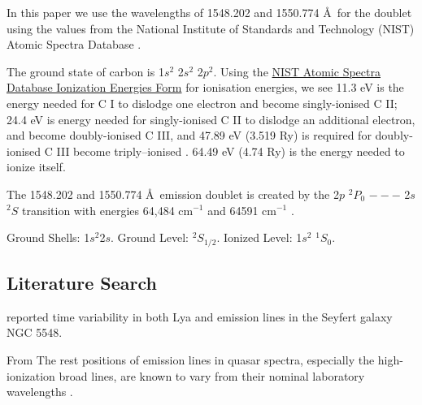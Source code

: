 \documentclass[a4paper,fleqn,usenatbib]{mnras}
\begin{document}
In this paper we use the wavelengths of 1548.202 and 1550.774 \AA\ for the \civ doublet
using the values from the National Institute of Standards and Technology (NIST) Atomic Spectra Database 
\citep{Kramida2018}. 


The ground state of carbon is 1$s^2$ 2$s^2$ 2$p^2$.
Using the \href{https://physics.nist.gov/PhysRefData/ASD/ionEnergy.html}{NIST Atomic Spectra Database Ionization Energies Form}
for ionisation energies, we see 
11.3 eV is the energy needed for C I to dislodge one electron and become singly-ionised C II; 
24.4 eV is energy needed for singly-ionised C II to dislodge an additional electron, and become doubly-ionised C III, 
and 47.89 eV  (3.519 Ry) is required for doubly-ionised C III  become triply--ionised \civ. 
64.49 eV (4.74 Ry) is the energy needed to ionize \civ itself. 

The 1548.202 	and 1550.774 \AA\ emission doublet is created by the 
2$p$ $^{2}P_{0}$ $---$  2$s$ $^{2}S$ transition with 
energies 64,484 cm$^{-1}$ and 64591 cm$^{-1}$ 
\citep[e.g.][]{Moore1993}. 

Ground  Shells:  1$s^{2}$2$s$. 
Ground  Level: $^{2}S_{1/2}$. 
Ionized  Level: 1$s^{2}$ $^{1}S_{0}$. 
 


\subsection{Literature Search}
\citet{Gregory1982} reported time variability in both Lya and  emission lines in the Seyfert galaxy NGC 5548.

From \citet{VandenBerk2001} 
The rest positions of emission lines in quasar spectra, especially the
high-ionization broad lines, are known to vary from their nominal
laboratory wavelengths \citep{Gaskell1982, Wilkes1986,  Espey1989, Espey1990Erratum, 
ZhengSulentic1990, Corbin1990, Weymann1991, TytlerFan1992, 
Brotherton1994, Laor1995, McIntosh1999}. 
\end{document}
